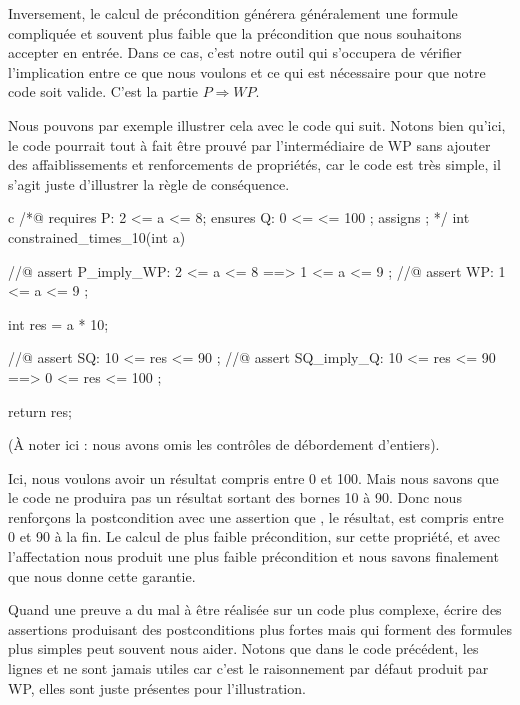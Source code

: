 Inversement, le calcul de précondition générera généralement une formule 
compliquée et souvent plus faible que la précondition que nous souhaitons
accepter en entrée. Dans ce cas, c'est notre outil qui s'occupera de vérifier 
l'implication entre ce que nous voulons et ce qui est nécessaire pour que notre
code soit valide. C'est la partie $P \Rightarrow WP$.



Nous pouvons par exemple illustrer cela avec le code qui suit. Notons bien qu'ici,
le code pourrait tout à fait être prouvé par l'intermédiaire de WP sans ajouter des
affaiblissements et renforcements de propriétés, car le code est très simple, il 
s'agit juste d'illustrer la règle de conséquence.



\begin{CodeBlock}{c}
/*@
  requires P: 2 <= a <= 8;
  ensures  Q: 0 <= \result <= 100 ;
  assigns  \nothing ;
*/
int constrained_times_10(int a){
  //@ assert P_imply_WP: 2 <= a <= 8 ==> 1 <= a <= 9 ;
  //@ assert WP:         1 <= a <= 9 ;

  int res = a * 10;

  //@ assert SQ:         10 <= res <= 90 ;
  //@ assert SQ_imply_Q: 10 <= res <= 90 ==> 0 <= res <= 100 ;

  return res;
}
\end{CodeBlock}



(À noter ici : nous avons omis les contrôles de débordement d'entiers).



Ici, nous voulons avoir un résultat compris entre 0 et 100. Mais nous savons que
le code ne produira pas un résultat sortant des bornes 10 à 90. Donc nous 
renforçons la postcondition avec une assertion que , le résultat, est compris
entre 0 et 90 à la fin. Le calcul de plus faible précondition, sur cette propriété,
et avec l'affectation  nous produit une plus faible précondition 
 et nous savons finalement que  nous donne cette garantie.



Quand une preuve a du mal à être réalisée sur un code plus complexe, écrire des
assertions produisant des postconditions plus fortes mais qui forment des formules
plus simples peut souvent nous aider. Notons que dans le code précédent, les lignes
 et  ne sont jamais utiles car c'est le raisonnement par
défaut produit par WP, elles sont juste présentes pour l'illustration.




